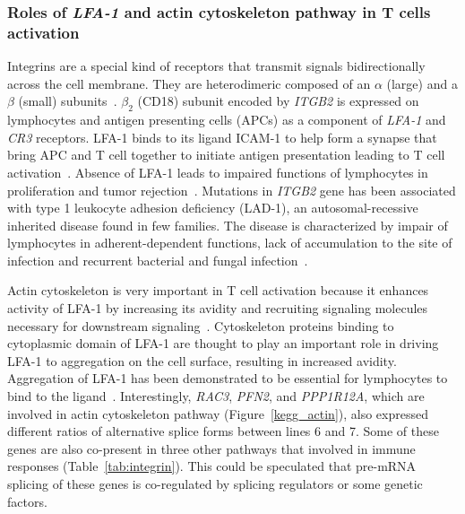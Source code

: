 \documentclass[10pt]{article}
\begin{document}
\subsubsection*{Roles of \textit{LFA-1} and actin cytoskeleton pathway in T cells activation}

Integrins are a special kind of receptors that transmit signals bidirectionally across the cell membrane.
They are heterodimeric composed of an $\alpha$ (large) and a $\beta$ (small)
subunits~\cite{wang2010immunopathologies}.
$\beta_{2}$ (CD18) subunit encoded by \textit{ITGB2} is expressed on lymphocytes and antigen presenting cells
(APCs) as a component of \textit{LFA-1} and \textit{CR3} receptors.
LFA-1 binds to its ligand ICAM-1 to help form a synapse that bring APC and T cell together to
initiate antigen presentation leading to T cell activation~\cite{dustin2000immunological}.
Absence of LFA-1 leads to impaired functions of lymphocytes in proliferation and
tumor rejection~\cite{scharffetter1998spontaneous,schmits1996lfa}.
Mutations in \textit{ITGB2} gene has been associated with type 1 leukocyte adhesion deficiency (LAD-1),
an autosomal-recessive inherited disease found in few families.
The disease is characterized by impair of lymphocytes in adherent-dependent functions, lack of accumulation
to the site of infection and recurrent bacterial and fungal infection~\cite{springer1987lymphocyte}.

Actin cytoskeleton is very important in T cell activation because it enhances activity of
LFA-1 by increasing its avidity and recruiting signaling molecules necessary for
downstream signaling~\cite{dustin2000immunological, van2000avidity}.
Cytoskeleton proteins binding to cytoplasmic domain of LFA-1 are thought to play an important role in
driving LFA-1 to aggregation on the cell surface, resulting in increased avidity.
Aggregation of LFA-1 has been demonstrated to be essential for lymphocytes to bind to the
ligand~\cite{van1994extracellular}.
Interestingly, \textit{RAC3}, \textit{PFN2}, and \textit{PPP1R12A}, which are involved in
actin cytoskeleton pathway (Figure~\ref{kegg_actin}), also expressed different ratios of alternative splice
forms between lines 6 and 7.
Some of these genes are also co-present in three other pathways
that involved in immune responses (Table~\ref{tab:integrin}).
This could be speculated that pre-mRNA splicing of these genes is co-regulated by splicing
regulators or some genetic factors.
\end{document}
